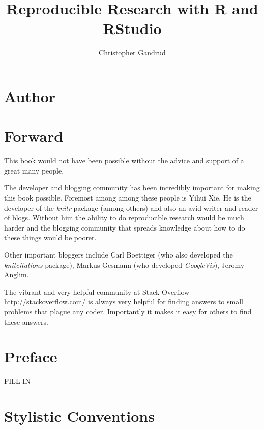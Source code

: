 \documentclass[ChapterTOCs,krantz1]{krantz}\usepackage{graphicx, color}
\begin{document}
\title{Reproducible Research with R and RStudio}

\author{Christopher Gandrud}

\maketitle

\frontmatter

{\chapter*{Author}}





\chapter*{Forward}

This book would not have been possible without the advice and support of a great many people.

The developer and blogging community has been incredibly important for making this book possible. Foremost among among these people is Yihui Xie. He is the developer of the {\emph{knitr}} package (among others) and also an avid writer and reader of blogs. Without him the ability to do reproducible research would be much harder and the blogging community that spreads knowledge about how to do these things would be poorer. 

Other important bloggers include Carl Boettiger (who also developed the {\emph{knitcitations}} package), Markus Gesmann (who developed {\emph{GoogleVis}}), Jeromy Anglim.

The vibrant and very helpful community at Stack Overflow \url{http://stackoverflow.com/} is always very helpful for finding answers to small problems that plague any coder. Importantly it makes it easy for others to find these answers.



\chapter*{Preface}

FILL IN


\chapter*{Stylistic Conventions}\label{StylisticConventions}
\begin{noindent}






\end{noindent}
\end{document}
